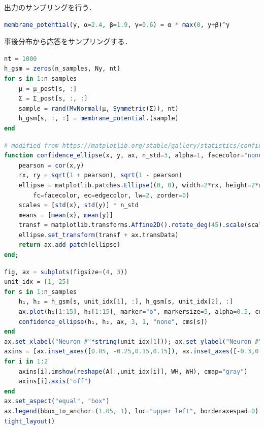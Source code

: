 出力のサンプリングを行う．
\begin{lstlisting}[language=julia]
membrane_potential(y, α=2.4, β=1.9, γ=0.6) = α * max(0, y+β)^γ
\end{lstlisting}
事後分布から応答をサンプリングする．
\begin{lstlisting}[language=julia]
nt = 1000
h_gsm = zeros(n_samples, Ny, nt)
for s in 1:n_samples
    μ = μ_post[s, :]
    Σ = Σ_post[s, :, :]
    sample = rand(MvNormal(μ, Symmetric(Σ)), nt)
    h_gsm[s, :, :] = membrane_potential.(sample)
end
\end{lstlisting}
\begin{lstlisting}[language=julia]
# modified from https://matplotlib.org/stable/gallery/statistics/confidence_ellipse.html
function confidence_ellipse(x, y, ax, n_std=3, alpha=1, facecolor="none", edgecolor="tab:gray")
    pearson = cor(x,y)
    rx, ry = sqrt(1 + pearson), sqrt(1 - pearson)
    ellipse = matplotlib.patches.Ellipse((0, 0), width=2*rx, height=2*ry, alpha=alpha, 
        fc=facecolor, ec=edgecolor, lw=2, zorder=0)
    scales = [std(x), std(y)] * n_std
    means = [mean(x), mean(y)]
    transf = matplotlib.transforms.Affine2D().rotate_deg(45).scale(scales...).translate(means...)
    ellipse.set_transform(transf + ax.transData)
    return ax.add_patch(ellipse)
end;
\end{lstlisting}
\begin{lstlisting}[language=julia]
fig, ax = subplots(figsize=(4, 3))
unit_idx = [1, 25]
for s in 1:n_samples
    h₁, h₂ = h_gsm[s, unit_idx[1], :], h_gsm[s, unit_idx[2], :]
    ax.plot(h₁[1:15], h₂[1:15], marker="o", markersize=5, alpha=0.5, color=cms[s], label=L"$z=$"*string(Z[s]))
    confidence_ellipse(h₁, h₂, ax, 3, 1, "none", cms[s])
end
ax.set_xlabel("Neuron #"*string(unit_idx[1])); ax.set_ylabel("Neuron #"*string(unit_idx[2]))
axins = [ax.inset_axes([0.85, -0.25,0.15,0.15]), ax.inset_axes([-0.3,0.85,0.15,0.15])]
for i in 1:2
    axins[i].imshow(reshape(A[:,unit_idx[i]], WH, WH), cmap="gray")
    axins[i].axis("off")
end
ax.set_aspect("equal", "box")
ax.legend(bbox_to_anchor=(1.05, 1), loc="upper left", borderaxespad=0)
tight_layout()
\end{lstlisting}
